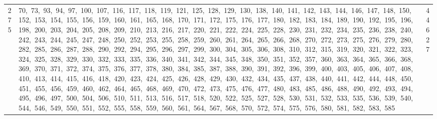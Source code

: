 \begin{longtable}{c|p{}|r}
275 & 70,\ 73,\ 93,\ 94,\ 97,\ 100,\ 107,\ 116,\ 117,\ 118,\ 119,\ 121,\ 125,\ 128,\ 129,\ 130,\ 138,\ 140,\ 141,\ 142,\ 143,\ 144,\ 146,\ 147,\ 148,\ 150,\ 152,\ 153,\ 154,\ 155,\ 156,\ 159,\ 160,\ 161,\ 165,\ 168,\ 170,\ 171,\ 172,\ 175,\ 176,\ 177,\ 180,\ 182,\ 183,\ 184,\ 189,\ 190,\ 192,\ 195,\ 196,\ 198,\ 200,\ 203,\ 204,\ 205,\ 208,\ 209,\ 210,\ 213,\ 216,\ 217,\ 220,\ 221,\ 222,\ 224,\ 225,\ 228,\ 230,\ 231,\ 232,\ 234,\ 235,\ 236,\ 238,\ 240,\ 242,\ 243,\ 244,\ 245,\ 247,\ 248,\ 250,\ 252,\ 253,\ 255,\ 258,\ 259,\ 260,\ 261,\ 264,\ 265,\ 266,\ 268,\ 270,\ 272,\ 273,\ 275,\ 276,\ 279,\ 280,\ 282,\ 285,\ 286,\ 287,\ 288,\ 290,\ 292,\ 294,\ 295,\ 296,\ 297,\ 299,\ 300,\ 304,\ 305,\ 306,\ 308,\ 310,\ 312,\ 315,\ 319,\ 320,\ 321,\ 322,\ 323,\ 324,\ 325,\ 328,\ 329,\ 330,\ 332,\ 333,\ 335,\ 336,\ 340,\ 341,\ 342,\ 344,\ 345,\ 348,\ 350,\ 351,\ 352,\ 357,\ 360,\ 363,\ 364,\ 365,\ 366,\ 368,\ 369,\ 370,\ 371,\ 372,\ 374,\ 375,\ 376,\ 377,\ 378,\ 380,\ 384,\ 385,\ 387,\ 388,\ 390,\ 391,\ 392,\ 396,\ 399,\ 400,\ 403,\ 405,\ 406,\ 407,\ 408,\ 410,\ 413,\ 414,\ 415,\ 416,\ 418,\ 420,\ 423,\ 424,\ 425,\ 426,\ 428,\ 429,\ 430,\ 432,\ 434,\ 435,\ 437,\ 438,\ 440,\ 441,\ 442,\ 444,\ 448,\ 450,\ 451,\ 455,\ 456,\ 459,\ 460,\ 462,\ 464,\ 465,\ 468,\ 469,\ 470,\ 472,\ 473,\ 475,\ 476,\ 477,\ 480,\ 483,\ 485,\ 486,\ 488,\ 490,\ 492,\ 493,\ 494,\ 495,\ 496,\ 497,\ 500,\ 504,\ 506,\ 510,\ 511,\ 513,\ 516,\ 517,\ 518,\ 520,\ 522,\ 525,\ 527,\ 528,\ 530,\ 531,\ 532,\ 533,\ 535,\ 536,\ 539,\ 540,\ 544,\ 546,\ 549,\ 550,\ 551,\ 552,\ 555,\ 558,\ 559,\ 560,\ 561,\ 564,\ 567,\ 568,\ 570,\ 572,\ 574,\ 575,\ 576,\ 580,\ 581,\ 582,\ 583,\ 585 & 44627 \\

\end{longtable}
